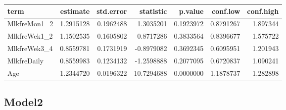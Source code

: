 \documentclass[]{article}
\newenvironment{Shaded}{\begin{snugshade}}{\end{snugshade}}
\newcommand{\DataTypeTok}[1]{\textcolor[rgb]{0.13,0.29,0.53}{#1}}
\newcommand{\KeywordTok}[1]{\textcolor[rgb]{0.13,0.29,0.53}{\textbf{#1}}}
\newcommand{\NormalTok}[1]{#1}
\newcommand{\OperatorTok}[1]{\textcolor[rgb]{0.81,0.36,0.00}{\textbf{#1}}}
\newcommand{\OtherTok}[1]{\textcolor[rgb]{0.56,0.35,0.01}{#1}}
\newcommand{\StringTok}[1]{\textcolor[rgb]{0.31,0.60,0.02}{#1}}
\begin{document}
\begin{longtable}[]{@{}lrrrrrr@{}}
\toprule
term & estimate & std.error & statistic & p.value & conf.low &
conf.high\tabularnewline
\midrule
\endhead
MlkfreMon1\_2 & 1.2915128 & 0.1962488 & 1.3035201 & 0.1923972 &
0.8791267 & 1.897344\tabularnewline
MlkfreWek1\_2 & 1.1502535 & 0.1605802 & 0.8717286 & 0.3833564 &
0.8396677 & 1.575722\tabularnewline
MlkfreWek3\_4 & 0.8559781 & 0.1731919 & -0.8979082 & 0.3692345 &
0.6095951 & 1.201943\tabularnewline
MlkfreDaily & 0.8559983 & 0.1234132 & -1.2598888 & 0.2077095 & 0.6720837
& 1.090241\tabularnewline
Age & 1.2344720 & 0.0196322 & 10.7294688 & 0.0000000 & 1.1878737 &
1.282898\tabularnewline
\bottomrule
\end{longtable}

\hypertarget{model2-5}{%
\subsection{Model2}\label{model2-5}}

\begin{Shaded}
\end{Shaded}
\end{document}
